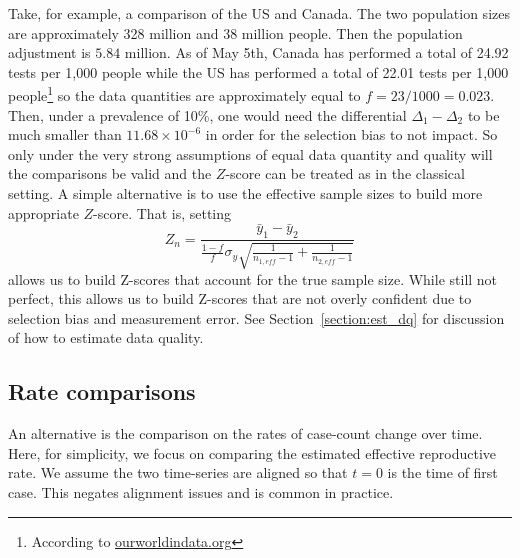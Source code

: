 \documentclass[11pt]{amsart}
\begin{document}
Take, for example, a comparison of the US and Canada.  The two population sizes are approximately 328 million and 38 million people.  Then the population adjustment is $5.84$ million. As of May 5th, Canada has performed a total of 24.92 tests per 1,000 people while the US has performed a total of 22.01 tests per 1,000 people\footnote{According to \href{https://ourworldindata.org/grapher/full-list-cumulative-total-tests-per-thousand}{ourworldindata.org}} so the data quantities are approximately equal to $f = 23/1000 = 0.023$.  Then, under a prevalence of 10\%, one would need the differential $\Delta_1-\Delta_2$ to be much smaller than $11.68 \times 10^{-6}$ in order for the selection bias to not impact.  So only under the very strong assumptions of equal data quantity and quality will the comparisons be valid and the $Z$-score can be treated as in the classical setting.  A simple alternative is to use the effective sample sizes to build more appropriate $Z$-score.  That is, setting
$$
Z_n = \frac{\bar y_1 - \bar y_2}{ \frac{1-f}{f} \sigma_y \sqrt{ \frac{1}{n_{1,eff} - 1} + \frac{1}{n_{2,eff} - 1}}}
$$
allows us to build Z-scores that account for the true sample size.  While still not perfect, this allows us to build Z-scores that are not overly confident due to selection bias and measurement error.  See Section~\ref{section:est_dq} for discussion of how to estimate data quality.

\subsection{Rate comparisons}

An alternative is the comparison on the rates of case-count change over time.  Here, for simplicity, we focus on comparing the estimated effective reproductive rate.  We assume the two time-series are aligned so that $t=0$ is the time of first case.  This negates alignment issues and is common in practice.
\end{document}
